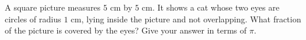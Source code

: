 A square picture measures $5$ cm by $5$ cm. It shows a cat whose two eyes are circles of radius $1$ cm, lying inside the picture and not overlapping. What fraction of the picture is covered by the eyes? Give your answer in terms of $\pi$.
